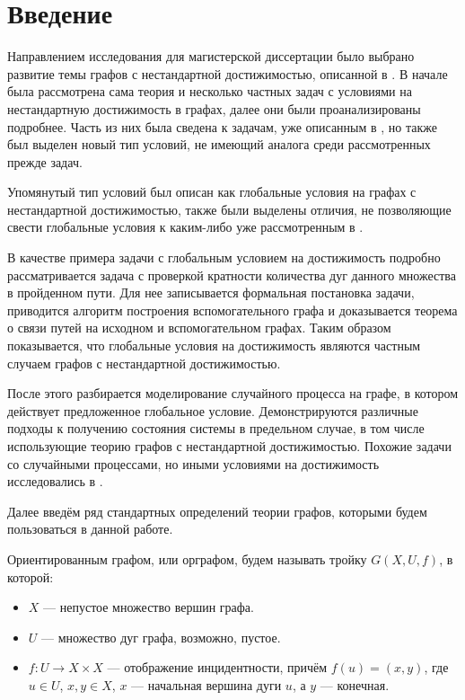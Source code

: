 
\section{Введение}

Направлением исследования для магистерской диссертации было выбрано развитие темы графов с нестандартной достижимостью, описанной в \cite{Mono}. В начале была рассмотрена сама теория и несколько частных задач с условиями на нестандартную достижимость в графах, далее они были проанализированы подробнее. Часть из них была сведена к задачам, уже описанным в \cite{Mono}, но также был выделен новый тип условий, не имеющий аналога среди рассмотренных прежде задач.

Упомянутый тип условий был описан как глобальные условия на графах с нестандартной достижимостью, также были выделены отличия, не позволяющие свести глобальные условия к каким-либо уже рассмотренным в \cite{Mono}. 

В качестве примера задачи с глобальным условием на достижимость подробно рассматривается задача с проверкой кратности количества дуг данного множества в пройденном пути. Для нее записывается формальная постановка задачи, приводится алгоритм построения вспомогательного графа и доказывается теорема о связи путей на исходном и вспомогательном графах. Таким образом показывается, что глобальные условия на достижимость являются частным случаем графов с нестандартной достижимостью. 

После этого разбирается моделирование случайного процесса на графе, в котором действует предложенное глобальное условие. Демонстрируются различные подходы к получению состояния системы в предельном случае, в том числе использующие теорию графов с нестандартной достижимостью. Похожие задачи со случайными процессами, но иными условиями на достижимость исследовались в \cite{J}.

Далее введём ряд стандартных определений теории графов, которыми будем пользоваться в данной работе. 

\begin{definition}
	Ориентированным графом, или орграфом, будем называть тройку $G(X,U,f)$, в которой:
	\begin{itemize}
		\item $X$ --- непустое множество вершин графа.
		\item $U$ --- множество дуг графа, возможно, пустое.
		\item $f:U\to X \times X$ --- отображение инцидентности, причём $f(u) = (x, y)$, где $u \in U$, $x, y \in X$, $x$ --- начальная вершина дуги $u$, а $y$ --- конечная.
	\end{itemize}
\end{definition}

